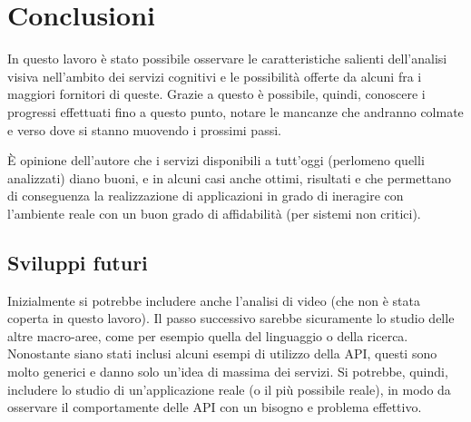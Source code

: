 
\section{Conclusioni}\label{sec:conclusioni}
In questo lavoro è stato possibile osservare le caratteristiche salienti dell'analisi visiva nell'ambito
dei servizi cognitivi e le possibilità offerte da alcuni fra i maggiori fornitori di queste.
Grazie a questo è possibile, quindi, conoscere i progressi effettuati fino a questo punto,
notare le mancanze che andranno colmate e verso dove si stanno muovendo i prossimi passi.

È opinione dell'autore che i servizi disponibili a tutt'oggi (perlomeno quelli analizzati)
diano buoni, e in alcuni casi anche ottimi, risultati e che permettano di conseguenza
la realizzazione di applicazioni in grado di ineragire con l'ambiente reale con un buon grado di affidabilità
(per sistemi non critici).
%
\subsection{Sviluppi futuri}
Inizialmente si potrebbe includere anche l'analisi di video (che non è stata coperta in questo lavoro).
Il passo successivo sarebbe sicuramente lo studio delle altre macro-aree, come per esempio quella del linguaggio o della ricerca.
Nonostante siano stati inclusi alcuni esempi di utilizzo della API, questi sono molto generici
e danno solo un'idea di massima dei servizi.
Si potrebbe, quindi, includere lo studio di un'applicazione reale (o il più possibile reale), in modo da osservare
il comportamente delle API con un bisogno e problema effettivo.

